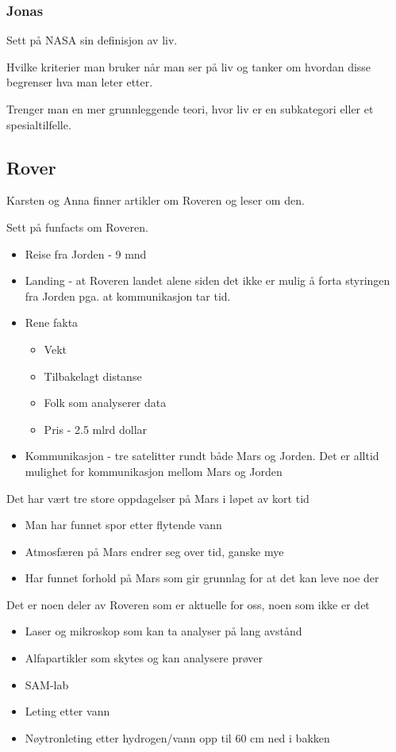 \documentclass[5p]{elsarticle}
\begin{document}
\subsubsection*{Jonas}
Sett på NASA sin definisjon av liv.

Hvilke kriterier man bruker når man ser på liv og tanker om hvordan disse begrenser hva man leter etter.

Trenger man en mer grunnleggende teori, hvor liv er en subkategori eller et spesialtilfelle.

\subsection*{Rover}
Karsten og Anna finner artikler om Roveren og leser om den.

Sett på funfacts om Roveren.

\begin{itemize}
\item Reise fra Jorden - 9 mnd
\item Landing - at Roveren landet alene siden det ikke er mulig å forta styringen fra Jorden pga. at kommunikasjon tar tid.
\item Rene fakta
\begin{itemize}
\item Vekt
\item Tilbakelagt distanse
\item Folk som analyserer data
\item Pris - 2.5 mlrd dollar
\end{itemize}
\item Kommunikasjon - tre satelitter rundt både Mars og Jorden. Det er alltid mulighet for kommunikasjon mellom Mars og Jorden
\end{itemize}

Det har vært tre store oppdagelser på Mars i løpet av kort tid
\begin{itemize}
\item Man har funnet spor etter flytende vann
\item Atmosfæren på Mars endrer seg over tid, ganske mye
\item Har funnet forhold på Mars som gir grunnlag for at det kan leve noe der
\end{itemize}

Det er noen deler av Roveren som er aktuelle for oss, noen som ikke er det
\begin{itemize}
\item Laser og mikroskop som kan ta analyser på lang avstånd
\item Alfapartikler som skytes og kan analysere prøver
\item SAM-lab
\item Leting etter vann
\item Nøytronleting etter hydrogen/vann opp til 60 cm ned i bakken
\end{itemize}
\end{document}
